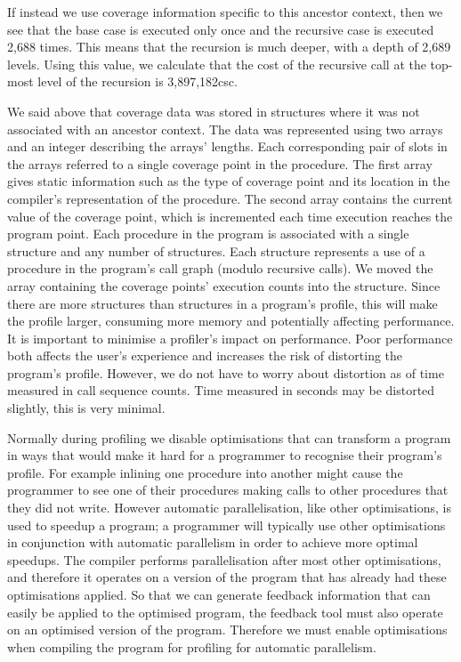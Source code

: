 If instead we use coverage information specific to this ancestor context,
then we see that the base case is executed only once and the recursive case
is executed 2,688 times.
This means that the recursion is much deeper,
with a depth of 2,689 levels.
Using this value,
we calculate that the cost of the recursive call at the top-most level of
the recursion is 
3,897,182csc.

We said above that coverage data was stored in \PS structures where it was
not associated with an ancestor context.
The data was represented using two arrays and an integer describing the
arrays' lengths.
Each corresponding pair of slots in the arrays referred to a single coverage
point in the procedure.
The first array gives static information such as the type of coverage point and
its location in the compiler's representation of the procedure.
The second array contains the current value of the coverage point,
which is incremented each time execution reaches the program point.
Each procedure in the program is associated with a single \PS structure
and any number of \PD structures.
Each \PD structure represents a use of a procedure in the program's
call graph (modulo recursive calls).
We moved the array containing the coverage points' execution
counts into the \PD structure.
Since there are more \PD structures than \PS structures in a program's
profile,
this will make the profile larger, consuming more memory and potentially
affecting performance.
It is important to minimise a profiler's impact on performance.
Poor performance both affects the user's experience and 
increases the risk of distorting the program's profile.
However, we do not have to worry about distortion as of time measured in
call sequence counts.
Time measured in seconds may be distorted slightly, this is very minimal.

Normally during profiling we disable optimisations that can transform a
program in ways that would make it hard for a programmer to recognise their
program's profile.
For example inlining one procedure into another might cause the programmer
to see one of their procedures making calls to other procedures that they
did not write.
However automatic parallelisation, like other optimisations,
is used to speedup a program;
a programmer will typically use other optimisations in conjunction with
automatic parallelism in order to achieve more optimal speedups.
The compiler performs parallelisation after most other optimisations,
and therefore it operates on a version of the program that has already had
these optimisations applied.
So that we can generate feedback information that can easily be applied to
the optimised program,
the feedback tool must also operate on an optimised version of the program.
Therefore we must enable optimisations when compiling the program for
profiling for automatic parallelism.

